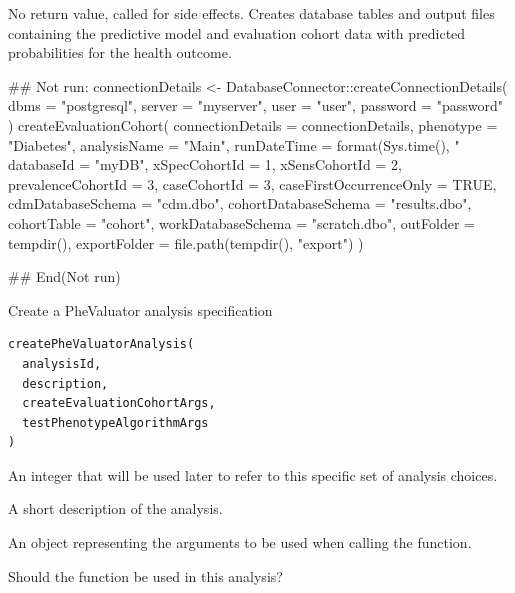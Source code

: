 \documentclass[a4paper]{book}
\begin{document}
%
\begin{Value}
No return value, called for side effects. Creates database tables and output files containing
the predictive model and evaluation cohort data with predicted probabilities for the health outcome.
\end{Value}
%
\begin{Examples}
\begin{ExampleCode}
## Not run: 
connectionDetails <- DatabaseConnector::createConnectionDetails(
  dbms = "postgresql",
  server = "myserver",
  user = "user",
  password = "password"
)
createEvaluationCohort(
  connectionDetails = connectionDetails,
  phenotype = "Diabetes",
  analysisName = "Main",
  runDateTime = format(Sys.time(), "%
  databaseId = "myDB",
  xSpecCohortId = 1,
  xSensCohortId = 2,
  prevalenceCohortId = 3,
  caseCohortId = 3,
  caseFirstOccurrenceOnly = TRUE,
  cdmDatabaseSchema = "cdm.dbo",
  cohortDatabaseSchema = "results.dbo",
  cohortTable = "cohort",
  workDatabaseSchema = "scratch.dbo",
  outFolder = tempdir(),
  exportFolder = file.path(tempdir(), "export")
)

## End(Not run)

\end{ExampleCode}
\end{Examples}
%
\begin{Description}
Create a PheValuator analysis specification
\end{Description}
%
\begin{Usage}
\begin{verbatim}
createPheValuatorAnalysis(
  analysisId,
  description,
  createEvaluationCohortArgs,
  testPhenotypeAlgorithmArgs
)
\end{verbatim}
\end{Usage}
%
\begin{Arguments}
\begin{ldescription}
\item[\code{analysisId}] An integer that will be used later to refer to this specific
set of analysis choices.

\item[\code{description}] A short description of the analysis.

\item[\code{createEvaluationCohortArgs}] An object representing the arguments to be used when calling
the  function.

\item[\code{testPhenotypeAlgorithmArgs}] Should the  function be used in this
analysis?
\end{ldescription}
\end{Arguments}
\end{document}
